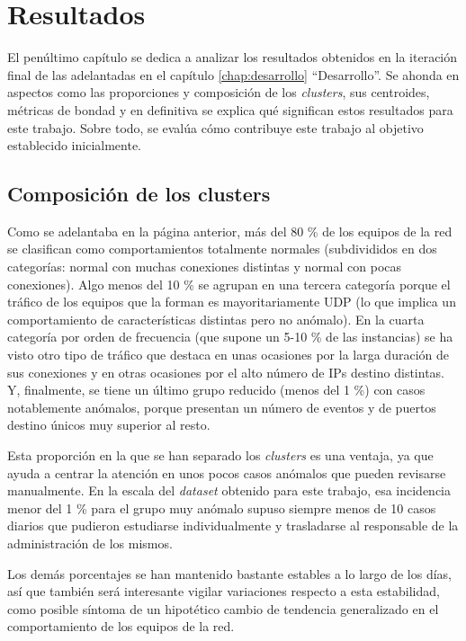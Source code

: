 \chapter{Resultados}\label{chap:resultados}

El penúltimo capítulo se dedica a analizar los resultados obtenidos en la iteración final de las adelantadas en el capítulo \ref{chap:desarrollo} ``Desarrollo''.
Se ahonda en aspectos como las proporciones y composición de los \emph{clusters}, sus centroides, métricas de bondad y en definitiva se explica qué significan estos resultados para este trabajo.
Sobre todo, se evalúa cómo contribuye este trabajo al objetivo establecido inicialmente.

\section{Composición de los clusters}\label{sec:composicionclusters}

Como se adelantaba en la página anterior, más del 80 \% de los equipos de la red se clasifican como comportamientos totalmente normales (subdivididos en dos categorías: normal con muchas conexiones distintas y normal con pocas conexiones).
Algo menos del 10 \% se agrupan en una tercera categoría porque el tráfico de los equipos que la forman es mayoritariamente UDP (lo que implica un comportamiento de características distintas pero no anómalo).
En la cuarta categoría por orden de frecuencia (que supone un 5-10 \% de las instancias) se ha visto otro tipo de tráfico que destaca en unas ocasiones por la larga duración de sus conexiones y en otras ocasiones por el alto número de IPs destino distintas.
Y, finalmente, se tiene un último grupo reducido (menos del 1 \%) con casos notablemente anómalos, porque presentan un número de eventos y de puertos destino únicos muy superior al resto.

Esta proporción en la que se han separado los \emph{clusters} es una ventaja, ya que ayuda a centrar la atención en unos pocos casos anómalos que pueden revisarse manualmente.
En la escala del \emph{dataset} obtenido para este trabajo, esa incidencia menor del 1 \% para el grupo muy anómalo supuso siempre menos de 10 casos diarios que pudieron estudiarse individualmente y trasladarse al responsable de la administración de los mismos.

Los demás porcentajes se han mantenido bastante estables a lo largo de los días, así que también será interesante vigilar variaciones respecto a esta estabilidad, como posible síntoma de un hipotético cambio de tendencia generalizado en el comportamiento de los equipos de la red.

